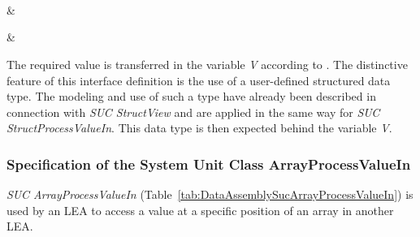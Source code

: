 \begin{footnotesize}
\begin{longtable}
		  \\ \hline
		
		\\ \hline
	
		\\ \hline
	
		     & 
		\\ \hline
	
		     & 
		\\ \hline
	
	\end{longtable}
\end{footnotesize}

The required value is transferred in the variable \emph{V} according to \cite{PNO.2025.Part4}. The distinctive feature of this interface definition is the use of a user-defined structured data type. The modeling and use of such a type have already been described in connection with \emph{SUC StructView} and are applied in the same way for \emph{SUC StructProcessValueIn}. This data type is then expected behind the variable \emph{V}. 

\subsubsection{Specification of the System Unit Class ArrayProcessValueIn}

\emph{SUC ArrayProcessValueIn} (Table~\ref{tab:DataAssemblySucArrayProcessValueIn}) is used by an LEA to access a value at a specific position of an array in another LEA.

